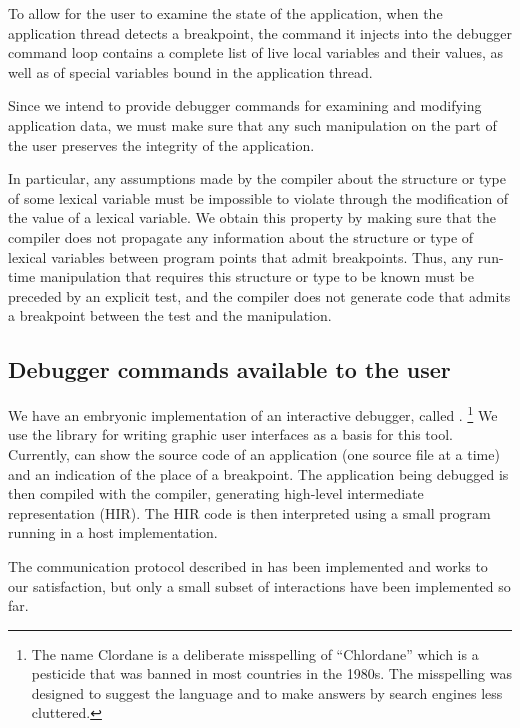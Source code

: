 To allow for the user to examine the state of the
application, when the application thread detects a breakpoint, the
command it injects into the debugger command loop contains a complete
list of live local variables and their values, as well as of special
variables bound in the application thread.

Since we intend to provide debugger commands for examining and
modifying application data, we must make sure that any such
manipulation on the part of the user preserves the integrity of the
application.

In particular, any assumptions made by the compiler about the
structure or type of some lexical variable must be impossible to
violate through the modification of the value of a lexical variable.
We obtain this property by making sure that the compiler does not
propagate any information about the structure or type of lexical
variables between program points that admit breakpoints.  Thus, any
run-time manipulation that requires this structure or type to be known
must be preceded by an explicit test, and the compiler does not
generate code that admits a breakpoint between the test and the
manipulation.

\subsection{Debugger commands available to the user}

We have an embryonic implementation of an interactive debugger, called
\clordane{}.%
\footnote{The name Clordane is a deliberate misspelling of
  ``Chlordane'' which is a pesticide that was banned in most countries
  in the 1980s.  The misspelling was designed to suggest the
  \commonlisp{} language and to make answers by search engines less
  cluttered.}
We use the \mcclim{} library for writing graphic user
interfaces as a basis for this tool.  Currently, \clordane{} can show
the source code of an application (one source file at a time) and an
indication of the place of a breakpoint.  The application being
debugged is then compiled with the \sicl{} compiler, generating
high-level intermediate representation (HIR).  The HIR code is then
interpreted using a small program running in a host \commonlisp{}
implementation.

The communication protocol described in
 has been implemented
and works to our satisfaction, but only a small subset of interactions
have been implemented so far.

